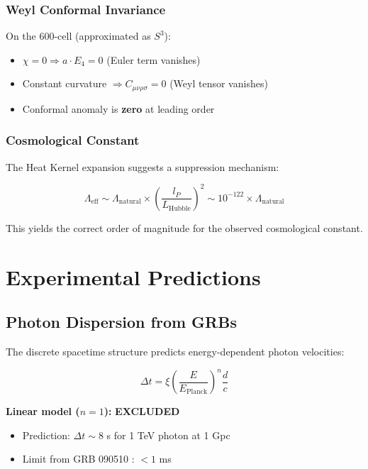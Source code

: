 \documentclass[12pt,a4paper]{article}
\begin{document}
\subsubsection{Weyl Conformal Invariance}

On the 600-cell (approximated as $S^3$):
\begin{itemize}
    \item $\chi = 0 \Rightarrow a \cdot E_4 = 0$ (Euler term vanishes)
    \item Constant curvature $\Rightarrow C_{\mu\nu\rho\sigma} = 0$ (Weyl tensor vanishes)
    \item Conformal anomaly is \textbf{zero} at leading order
\end{itemize}

\subsubsection{Cosmological Constant}

The Heat Kernel expansion suggests a suppression mechanism:

\begin{equation}
\Lambda_{\text{eff}} \sim \Lambda_{\text{natural}} \times \left(\frac{l_P}{L_{\text{Hubble}}}\right)^2 \sim 10^{-122} \times \Lambda_{\text{natural}}
\end{equation}

This yields the correct order of magnitude for the observed cosmological constant.

\section{Experimental Predictions}

\subsection{Photon Dispersion from GRBs}

The discrete spacetime structure predicts energy-dependent photon velocities:

\begin{equation}
\Delta t = \xi \left(\frac{E}{E_{\text{Planck}}}\right)^n \frac{d}{c}
\end{equation}

\textbf{Linear model ($n=1$):} \textbf{EXCLUDED}
\begin{itemize}
    \item Prediction: $\Delta t \sim 8$ s for 1 TeV photon at 1 Gpc
    \item Limit from GRB 090510 \cite{fermi2009}: $< 1$ ms
\end{itemize}
\end{document}
